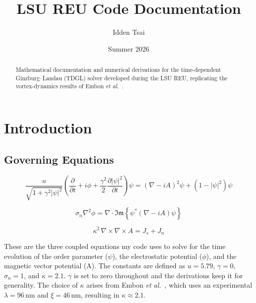 \documentclass[11pt]{article}
\title{LSU REU Code Documentation}
\author{Idden Tsai}
\date{Summer 2026}
\theoremstyle{definition}
\renewcommand{\Im}{\mathfrak{Im}}
\begin{document}
\maketitle

\begin{abstract}
\noindent
Mathematical documentation and numerical derivations for the time-dependent Ginzburg--Landau (TDGL) solver developed during the LSU REU, replicating the vortex-dynamics results of Embon \textit{et al.}~\cite{embon2017}.
\end{abstract}

\tableofcontents

\newpage


\section{Introduction}
\label{sec:intro}

\subsection{Governing Equations}
\label{sec:governing-equations}

\begin{equation}
\label{eq:tdgl-psi}
\frac{u}{\sqrt{1 + \gamma^2 |\psi|^2}} \left( \frac{\partial}{\partial t} + i \phi + \frac{\gamma^2}{2} \frac{\partial |\psi|^2}{\partial t} \right) \psi = (\nabla - i A)^2 \psi + (1 - |\psi|^2) \psi
\end{equation}

\begin{equation}
\label{eq:tdgl-phi}
\sigma_n \nabla^2 \phi = \nabla \cdot \Im\!\left\{ \psi^* (\nabla - i A) \psi \right\}
\end{equation}

\begin{equation}
\label{eq:tdgl-ampere}
\kappa^2 \, \nabla \times \nabla \times A = J_s + J_n
\end{equation}

These are the three coupled equations my code uses to solve for the time evolution of the order parameter ($\psi$), the electrostatic potential ($\phi$), and the magnetic vector potential (A). The constants are defined as $u = 5.79$, $\gamma = 0$, $\sigma_n = 1$, and $\kappa = 2.1$. $\gamma$ is set to zero throughout and the derivations keep it for generality. The choice of $\kappa$ arises from Embon \textit{et al.}~\cite{embon2017}, which uses an experimental $\lambda = 96\,\text{nm}$ and $\xi = 46\,\text{nm}$, resulting in $\kappa \approx 2.1$.
\end{document}
